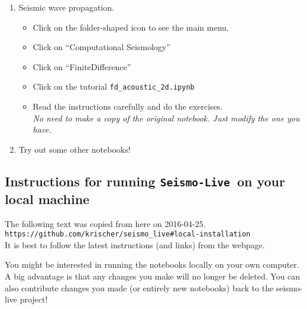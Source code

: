 \documentclass[11pt,titlepage,fleqn]{article}
\newcommand{\slive}{{\tt Seismo-Live}}
\begin{document}
\begin{enumerate}
\item Seismic wave propagation.
\begin{itemize}
\item Click on the folder-shaped icon to see the main menu.
\item Click on ``Computational Seismology''
\item Click on ``FiniteDifference''
\item Click on the tutorial \verb+fd_acoustic_2d.ipynb+
\item Read the instructions carefully and do the exercises. \\
{\em No need to make a copy of the original notebook. Just modify the one you have.}
\end{itemize}

\item Try out some other notebooks!

\end{enumerate}


\subsection*{Instructions for running \slive\ on your local machine}

The following text was copied from here on 2016-04-25. \\
\verb+https://github.com/krischer/seismo_live#local-installation+ \\
It is best to follow the latest instructions (and links) from the webpage.

\bigskip\noindent
You might be interested in running the notebooks locally on your own computer. A big advantage is that any changes you make will no longer be deleted. You can also contribute changes you made (or entirely new notebooks) back to the seismo-live project!
\end{document}
